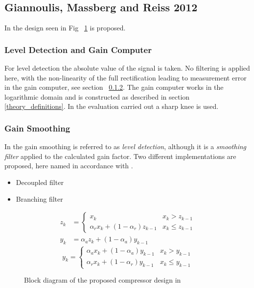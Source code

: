 \documentclass[../main2.tex]{subfiles}
\providecommand{\rootdir}{..}
\begin{document}
\subsection{Giannoulis, Massberg and Reiss 2012}
In \cite{reiss2012tutorial} the design seen in Fig ~\ref{fig:block_reiss_theory} is proposed.
\subsubsection{Level Detection and Gain Computer}
For level detection the absolute value of the signal is taken. No filtering is applied here, with the non-linearity of the full rectification leading to measurement error in the gain computer, see section ~\ref{}. The gain computer works in the logarithmic domain and is constructed as described in section \ref{theory_definitions}. In the evaluation carried out a sharp knee is used. 
\subsubsection{Gain Smoothing}
In \cite{reiss2012tutorial} the gain smoothing is referred to as \emph{level detection}, although it is a \emph{smoothing filter} applied to the calculated gain factor. Two different implementations are proposed, here named in accordance with \cite{reiss2012tutorial}.
\begin{itemize}
\item{Decoupled filter}
\item{Branching filter}
\end{itemize}
\begin{equation}
\begin{split}
z_k &= \begin{cases}
    x_k 								& x_k > z_{k-1} \\
    \alpha_{r} x_k + (1-\alpha_{r}) z_{k-1} 	& x_k \leq z_{k-1}
\end{cases} \\
y_k &= \alpha_{a} z_k + (1-\alpha_{a}) y_{k-1}
\end{split}
\end{equation}
\begin{equation}
y_k = \begin{cases}
    \alpha_{a} x_k + (1-\alpha_{a}) y_{k-1} 	& x_k > y_{k-1} \\
    \alpha_{r} x_k + (1-\alpha_{r}) y_{k-1} 	& x_k \leq y_{k-1}
\end{cases}
\end{equation}
\begin{figure}
\centerline{}
\caption{Block diagram of the proposed compressor design in \cite{reiss2012tutorial}}
\label{fig:block_reiss_theory}
\end{figure}
\end{document}
